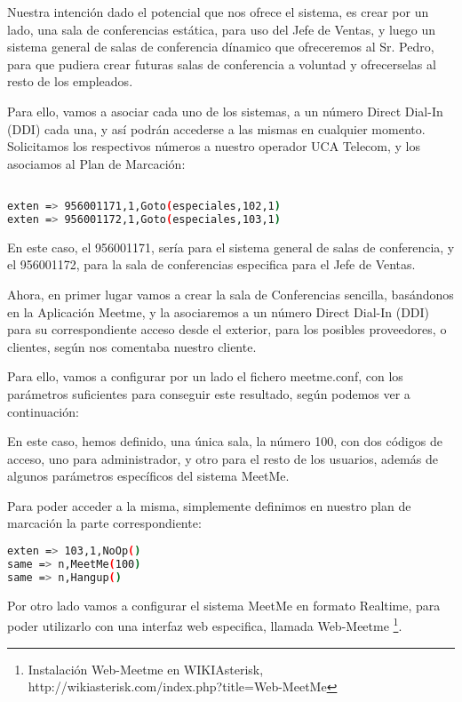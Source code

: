 Nuestra intención dado el potencial que nos ofrece el sistema, es crear por un lado, una sala de conferencias estática, para uso del Jefe de Ventas, y luego un sistema general de salas de conferencia dínamico que ofreceremos al Sr. Pedro, para que pudiera crear futuras salas de conferencia a voluntad y ofrecerselas al resto de los empleados.

Para ello, vamos a asociar cada uno de los sistemas, a un número Direct Dial-In (DDI) cada una, y así podrán accederse a las mismas en cualquier momento. Solicitamos los respectivos números a nuestro operador UCA Telecom, y los asociamos al Plan de Marcación:

\begin{lstlisting}[language=bash,title={/etc/asterisk/extensions.conf}]

exten => 956001171,1,Goto(especiales,102,1)
exten => 956001172,1,Goto(especiales,103,1)

\end{lstlisting}

En este caso, el 956001171, sería para el sistema general de salas de conferencia, y el 956001172, para la sala de conferencias especifica para el Jefe de Ventas.

Ahora, en primer lugar vamos a crear la sala de Conferencias sencilla, basándonos en la Aplicación Meetme, y la asociaremos a un número Direct Dial-In (DDI) para su correspondiente acceso desde el exterior, para los posibles proveedores, o clientes, según nos comentaba nuestro cliente.

Para ello, vamos a configurar por un lado el fichero meetme.conf, con los parámetros suficientes para conseguir este resultado, según podemos ver a continuación:



En este caso, hemos definido, una única sala, la número 100, con dos códigos de acceso, uno para administrador, y otro para el resto de los usuarios, además de algunos parámetros específicos del sistema MeetMe.

Para poder acceder a la misma, simplemente definimos en nuestro plan de marcación la parte correspondiente:

\begin{lstlisting}[language=bash,title={/etc/asterisk/extensions.conf}]
exten => 103,1,NoOp()
same => n,MeetMe(100)
same => n,Hangup()
\end{lstlisting}

Por otro lado vamos a configurar el sistema MeetMe en formato Realtime, para poder utilizarlo con una interfaz web especifica, llamada Web-Meetme \footnote{Instalación Web-Meetme en WIKIAsterisk, http://wikiasterisk.com/index.php?title=Web-MeetMe}.

